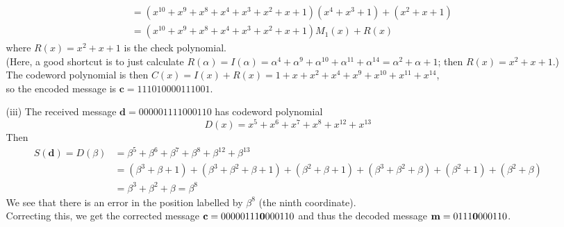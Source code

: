 \documentclass[11pt]{article}
\renewcommand{\vec}[1]{\mathbf{#1}}
\begin{document}
\begin{itemize}
\begin{itemize}
\begin{align*}
                          &= (x^{10}+x^9+x^8+x^4+x^3+x^2+x+1)(x^4+x^3+1) + (x^2+x+1)\\
                          &= (x^{10}+x^9+x^8+x^4+x^3+x^2+x+1)M_1(x) + R(x)
                   \end{align*}
                   where $R(x) = x^2+x+1$ is the check polynomial.\\
                   (Here, a good shortcut is to just calculate
                   $R(\alpha) = I(\alpha) = \alpha^4 + \alpha^9 + \alpha^{10} + \alpha^{11} + \alpha^{14} = \alpha^2 + \alpha + 1$;
                   then $R(x) = x^2 + x + 1$.)\\
                   The codeword polynomial is then
                   $C(x) = I(x) + R(x) = 1 + x + x^2 + x^4 + x^9 + x^{10} + x^{11} + x^{14}$,\\
                   so the encoded message is $\vec{c} = \text{111010000111001}$.
      \item[(iii)] The received message $\vec{d} = \text{000001111000110}$
                   has codeword polynomial
                   \[
                     D(x) = x^5 + x^6 + x^7 + x^8 + x^{12} + x^{13}
                   \]
                   Then
                   \begin{align*}
                     S(\vec{d}) = D(\beta)
                               &= \beta^5    + \beta^6    + \beta^7    + \beta^8    + \beta^{12} + \beta^{13}\\
                               &= (\beta^3 + \beta + 1) + (\beta^3 + \beta^2 + \beta + 1)
                                 +(\beta^2 + \beta + 1) + (\beta^3 + \beta^2 + \beta)
                                 +(\beta^2 + 1) + (\beta^2 + \beta)\\
                               &= \beta^3 + \beta^2 + \beta
                                = \beta^8
                   \end{align*}
                   We see that there is an error in the position labelled by $\beta^8$ (the ninth coordinate).\\
                   Correcting this, we get the corrected message
                   $\vec{c} = \text{00000111\textbf{0}000110}$
                   and thus the decoded message
                   $\vec{m} = \text{0111\textbf{0}000110}$.
        \end{itemize}
\end{itemize}
\end{document}
